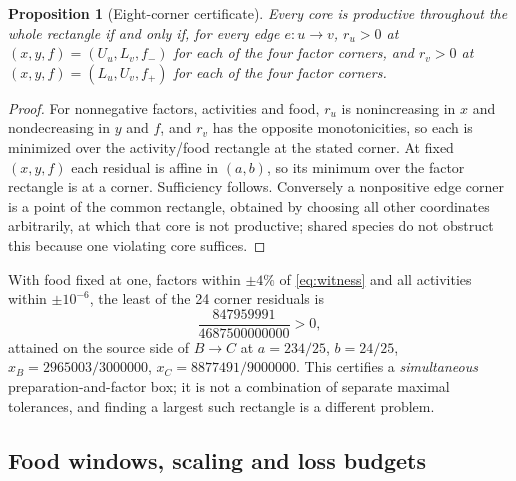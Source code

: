 \documentclass[11pt,a4paper]{article}
\theoremstyle{plain}
\newtheorem{proposition}[theorem]{Proposition}
\theoremstyle{definition}
\theoremstyle{remark}
\begin{document}
\begin{proposition}[Eight-corner certificate]\label{prop:corner}
Every core is productive throughout the whole rectangle if and only if, for every edge $e\colon u\to v$, $r_u>0$ at $(x,y,f)=(U_u,L_v,f_-)$ for each of the four factor corners, and $r_v>0$ at $(x,y,f)=(L_u,U_v,f_+)$ for each of the four factor corners.
\end{proposition}

\begin{proof}
For nonnegative factors, activities and food, $r_u$ is nonincreasing in $x$ and nondecreasing in $y$ and $f$, and $r_v$ has the opposite monotonicities, so each is minimized over the activity/food rectangle at the stated corner. At fixed $(x,y,f)$ each residual is affine in $(a,b)$, so its minimum over the factor rectangle is at a corner. Sufficiency follows. Conversely a nonpositive edge corner is a point of the common rectangle, obtained by choosing all other coordinates arbitrarily, at which that core is not productive; shared species do not obstruct this because one violating core suffices.
\end{proof}

With food fixed at one, factors within $\pm4\%$ of \eqref{eq:witness} and all activities within $\pm10^{-6}$, the least of the 24 corner residuals is
\begin{equation}\label{eq:jointmargin}
  \frac{847959991}{4687500000000}>0,
\end{equation}
attained on the source side of $B\to C$ at $a=234/25$, $b=24/25$, $x_B=2965003/3000000$, $x_C=8877491/9000000$. This certifies a \emph{simultaneous} preparation-and-factor box; it is not a combination of separate maximal tolerances, and finding a largest such rectangle is a different problem.

\subsection{Food windows, scaling and loss budgets}
\end{document}
